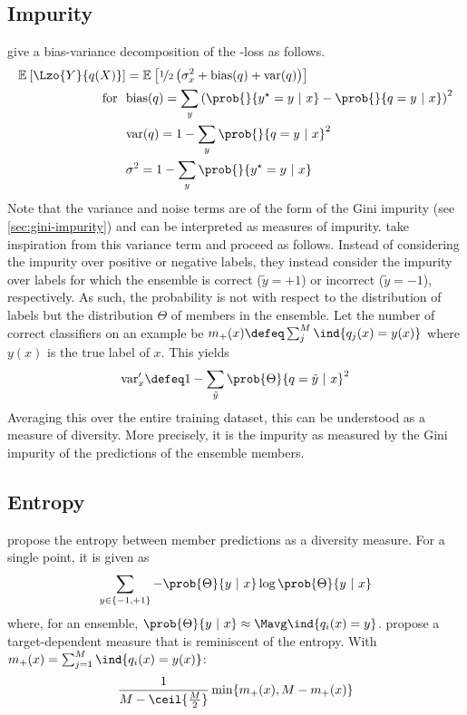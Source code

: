 \documentclass[../main.tex]{subfiles}
\begin{document}
\subsection{Impurity} 
\citeauthor{KohaviWolpert} give a bias-variance decomposition of the \zeroone-loss as follows.
$$
\begin{align}
\mathbb{E}_{}\left[ \Lzo{Y}{q(X)} \right] &= 
\mathbb{E}_{}\left[  
\nicefrac{1}{2}\left( \sigma^2_{x} + \text{bias}(q) + \text{var}(q)   \right)
\right] \\
\text{for} ~ ~ & \text{bias}(q) =  \sum_{y} \left(  \prob{}{y^\star = y ~|~x} - \prob{}{q=y ~|~ x} \right)^2 \\
& \text{var}(q) = 1 - \sum_{y} \prob{}{q=y ~|~x}^2  \\
& \sigma^2 = 1 - \sum_{y} \prob{}{y^\star = y ~|~ x}
\end{align}
$$
Note that the variance and noise terms are of the form of the Gini impurity (see \ref{sec:gini-impurity}) and can be interpreted as measures of impurity.
\citeauthor{kuncheva_MeasuresDiversityClassifier_2003} take inspiration from this variance term and proceed as follows. Instead of considering the impurity over positive or negative labels, they instead consider the impurity over labels for which the ensemble is correct ($\tilde{y} = +1$) or incorrect ($\tilde{y} = -1$), respectively. As such, the probability is not with respect to the distribution of labels but the distribution $\Theta$ of members in the ensemble. Let the number of correct classifiers on an example be $m_{+}(x) \defeq \sum_{j}^M \ind{q_{j}(x) = y(x)}$ where $y(x)$ is the true label of $x$. This yields
$$
\text{var}'_{x} \defeq 1 - \sum_{\tilde{y}} \prob{\Theta}{q = \tilde{y} ~ |~ x}^2
$$
Averaging this over the entire training dataset, this can be understood as a measure of diversity. More precisely, it is the impurity as measured by the Gini impurity of the predictions of the ensemble members.

\subsection{Entropy}
\citeauthor{cunningham_DiversityQualityClassification_2000} propose the entropy between member predictions as a diversity measure. For a single point, it is given as
$$
\sum_{y \in \{ -1, +1 \}} - \prob{\Theta}{y ~|~x} \log \prob{\Theta}{y~|~x}
$$
where, for an ensemble, $\prob{\Theta}{y~|~x} \approx \Mavg \ind{q_{i}(x) = y}$.
\citeauthor{shipp_RelationshipsCombinationMethods_2002} propose a target-dependent measure that is reminiscent of the entropy. With $m_{+}(x) = \sum_{j=1}^M \ind{q_{i}(x) = y(x)}$:
$$
\frac{1}{M - \ceil{\frac{M}{2}}} \min \{ m_{+}(x), M-m_{+}(x) \}
$$
\end{document}
